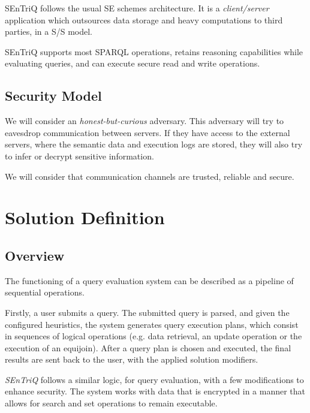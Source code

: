 \gls{SEnTriQ} follows the usual \gls{SE} schemes architecture. It is a \emph{client/server} application which outsources data storage and heavy computations to third parties, in a \gls{S/S} model.

\gls{SEnTriQ} supports most \gls{SPARQL} operations, retains reasoning capabilities while evaluating queries, and can execute secure read and write operations.


\subsection{Security Model}
\label{ch3:sec:solution-models:security-model}

We will consider an \emph{honest-but-curious} adversary. This adversary will try to eavesdrop communication between servers. If they have access to the external servers, where the semantic data and execution logs are stored, they will also try to infer or decrypt sensitive information. 

We will consider that communication channels are trusted, reliable and secure. 

\section{Solution Definition}
\label{ch3:sec:solution-definition}

\subsection{Overview}

The functioning of a query evaluation system can be described as a pipeline of sequential operations.  

Firstly, a user submits a query. The submitted query is parsed, and given the configured heuristics, the system generates query execution plans, which consist in sequences of logical operations (e.g. data retrieval, an update operation or the execution of an equijoin). After a query plan is chosen and executed, the final results are sent back to the user, with the applied solution modifiers.

\emph{SEnTriQ} follows a similar logic, for query evaluation, with a few modifications to enhance security. The system works with data that is encrypted in a manner that allows for search and set operations to remain executable. %

